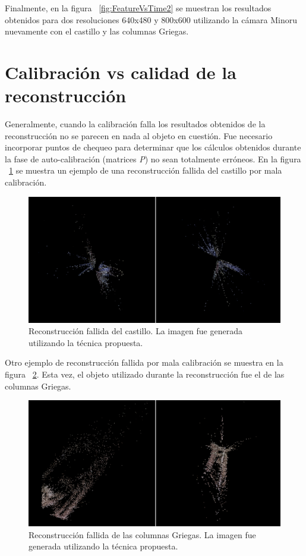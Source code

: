 Finalmente, en la figura ~\ref{fig:FeatureVsTime2} se muestran los resultados obtenidos para dos resoluciones 640x480 y 800x600 utilizando la c\'{a}mara Minoru nuevamente con el castillo y las columnas Griegas.


\section{Calibraci\'{o}n vs calidad de la reconstrucci\'{o}n}
Generalmente, cuando la calibraci\'{o}n falla los resultados obtenidos de la reconstrucci\'{o}n no se parecen en nada al objeto en cuesti\'{o}n. Fue necesario incorporar puntos de chequeo para determinar que los c\'{a}lculos obtenidos durante la fase de auto-calibraci\'{o}n (matrices \textit{P}) no sean totalmente err\'{o}neos. En la figura ~\ref{fig:WrongCalibration1} se muestra un ejemplo de una reconstrucci\'{o}n fallida del castillo por mala calibraci\'{o}n.

\begin{figure}[H]
\centering
\includegraphics[width=1.0\textwidth]{images/wrongcal1.png}
\caption[Reconstrucci\'{o}n fallida del castillo]%
{Reconstrucci\'{o}n fallida del castillo. La imagen fue generada utilizando la t\'{e}cnica propuesta.}
\label{fig:WrongCalibration1}
\end{figure}

Otro ejemplo de reconstrucci\'{o}n fallida por mala calibraci\'{o}n se muestra en la figura ~\ref{fig:WrongCalibration2}. Esta vez, el objeto utilizado durante la reconstrucci\'{o}n fue el de las columnas Griegas.

\begin{figure}[H]
\centering
\includegraphics[width=1.0\textwidth]{images/wrongcal2.png}
\caption[Reconstrucci\'{o}n fallida de las columnas Griegas]%
{Reconstrucci\'{o}n fallida de las columnas Griegas. La imagen fue generada utilizando la t\'{e}cnica propuesta.}
\label{fig:WrongCalibration2}
\end{figure}

